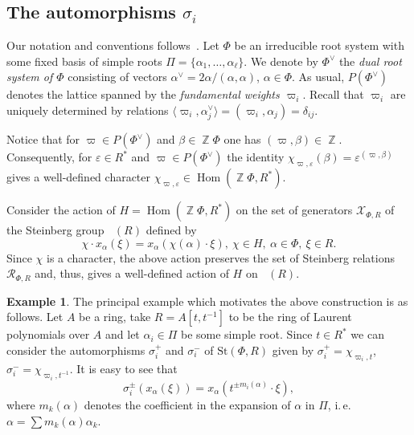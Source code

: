 \documentclass[oneside,12pt]{amsart}
\numberwithin{equation}{section}
\numberwithin{lem}{section}
\theoremstyle{definition}
\newtheorem{example}[lem]{Example}
\theoremstyle{remark}
\DeclareMathOperator{\St}{St^G}
\DeclareMathOperator{\Hom}{Hom}
\DeclareMathOperator{\ZZ}{{\mathbb Z}}
\newcommand{\Stb}{\mathrm{St}}
\begin{document}
\subsection{The automorphisms \texorpdfstring{$\sigma_i$}{\textsigma\textiinferior}} \label{sec:sigma}
Our notation and conventions follows~\cite[\S~4]{VavWE}.
Let $\Phi$ be an irreducible root system with some fixed basis of simple roots $\Pi = \{\alpha_1, \ldots, \alpha_\ell\}$.
We denote by $\Phi^\vee$ the \emph{dual root system of $\Phi$} consisting of vectors $\alpha^\vee = 2\alpha/(\alpha, \alpha)$, $\alpha\in \Phi$.
As usual, $P(\Phi^\vee)$ denotes the lattice spanned by the \emph{fundamental weights $\varpi_i$}.
Recall that $\varpi_i$ are uniquely determined by relations $\langle\varpi_i, \alpha_j^\vee \rangle = (\varpi_i, \alpha_j) = \delta_{ij}.$

Notice that for $\varpi \in P(\Phi^\vee)$ and $\beta \in \ZZ \Phi$ one has $(\varpi, \beta) \in \ZZ$.
Consequently, for $\varepsilon \in R^*$ and $\varpi \in P(\Phi^\vee)$ the identity $\chi_{\varpi, \varepsilon}(\beta) = \varepsilon ^ {(\varpi, \beta)}$
gives a well-defined character $\chi_{\varpi, \varepsilon} \in \Hom(\ZZ \Phi, R^*)$.

Consider the action of $H=\Hom(\ZZ \Phi, R^*)$ on the set of generators $\mathcal{X}_{\Phi, R}$ of the Steinberg group $\St(R)$ defined by
\begin{equation} \chi \cdot x_\alpha(\xi) = x_\alpha(\chi(\alpha) \cdot \xi),\ \chi \in H,\ \alpha\in \Phi,\ \xi \in R. \end{equation}
Since $\chi$ is a character, the above action preserves the set of Steinberg relations $\mathcal{R}_{\Phi, R}$ and,
thus, gives a well-defined action of $H$ on $\St(R)$.

\begin{example} The principal example which motivates the above construction is as follows.
Let $A$ be a ring, take $R = A[t, t^{-1}]$ to be the ring of Laurent polynomials over $A$ and let $\alpha_i \in \Pi$ be some simple root.
Since $t \in R^*$ we can consider the automorphisms $\sigma_i^+$ and $\sigma_i^-$ of $\Stb(\Phi, R)$ given by $\sigma_i^+ = \chi_{\varpi_i, t}$, $\sigma_i^- = \chi_{\varpi_i, t^{-1}}$.
It is easy to see that
\begin{equation}\label{eq:sigma_act} \sigma_i^\pm(x_\alpha(\xi)) = x_\alpha(t^{\pm m_i(\alpha)} \cdot \xi),\end{equation}
where $m_k(\alpha)$ denotes the coefficient in the expansion of $\alpha$ in $\Pi$, i.\,e. $\alpha = \sum m_k(\alpha) \alpha_k$.
\end{example}
\end{document}
